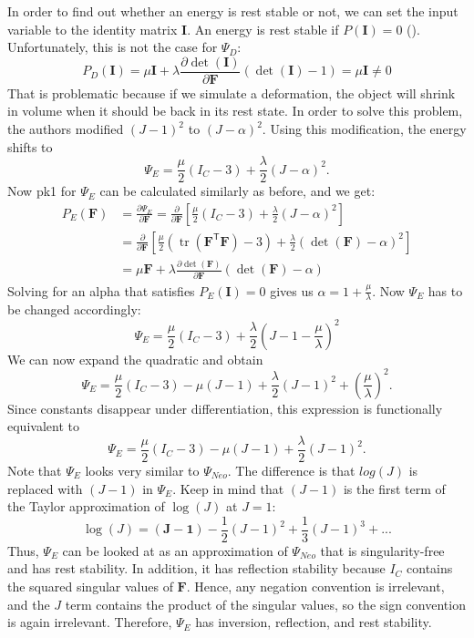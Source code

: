 {{{\[\]
In order to find out whether an energy is rest stable or not, we can set the input variable to the identity matrix $\mathbf{I}$. An energy is rest stable if $P(\mathbf{I})=0$ (\cite{Smith:2018:SNF:3191713.3180491}). Unfortunately, this is not the case for $\Psi_{D}$:
\[
P_{D}(\mathbf{I}) = \mu \mathbf{I} + \lambda \frac{\partial \operatorname{det}(\mathbf{I})}{\partial \mathbf{F}}(\operatorname{det}(\mathbf{I})-1) = \mu \mathbf{I} \neq 0
\]
That is problematic because if we simulate a deformation, the object will shrink in volume when it should be back in its rest state. In order to solve this problem, the authors modified $(J-1)^{2}$ to $(J-\alpha)^{2}$. Using this modification, the energy shifts to
\[
\Psi_{E} = \frac{\mu}{2}\left(I_{C}-3\right) +\frac{\lambda}{2}(J-\alpha)^{2}.
\]
Now \acrshort{pk1} for $\Psi_E$ can be calculated similarly as before, and we get:
\begin{align*}
P_{E}(\mathbf{F}) &= \frac{\partial \Psi_{E}}{\partial \mathbf{F}} = \frac{\partial}{\partial \mathbf{F}}  \left[ \frac{\mu}{2}\left(I_{C}-3\right) +\frac{\lambda}{2}(J-\alpha)^{2} \right] \\
&= \frac{\partial}{\partial \mathbf{F}}  \left[ \frac{\mu}{2}\left(\operatorname{tr}(\mathbf{F}^\mathsf{T} \mathbf{F})-3\right) +\frac{\lambda}{2}(\operatorname{det}(\mathbf{F})-\alpha)^{2} \right] \\
&= \mu \mathbf{F} + \lambda \frac{\partial \operatorname{det}(\mathbf{F})}{\partial \mathbf{F}} (\operatorname{det}(\mathbf{F})-\alpha)
\end{align*}
Solving for an alpha that satisfies $P_{E}(\mathbf{I})=0$ gives us $\alpha=1+\frac{\mu}{\lambda}$. Now $\Psi_{E}$ has to be changed accordingly:
\[
\Psi_{E} = \frac{\mu}{2}\left(I_{C}-3\right) +\frac{\lambda}{2}(J-1-\frac{\mu}{\lambda})^{2}
\]
We can now expand the quadratic and obtain
\[
\Psi_{E} = \frac{\mu}{2}\left(I_{C}-3\right) - \mu\left(J-1\right) + \frac{\lambda}{2}(J-1)^{2} + \left(\frac{\mu}{\lambda}\right)^{2}.
\]
Since constants disappear under differentiation, this expression is functionally equivalent to 
\begin{equation}\label{energy_without_barrier}
\Psi_{E} = \frac{\mu}{2}\left(I_{C}-3\right) - \mu\left(J-1\right) + \frac{\lambda}{2}(J-1)^{2}.
\end{equation}
Note that $\Psi_{E}$ looks very similar to $\Psi_{Neo}$. The difference is that $log(J)$ is replaced with $(J-1)$ in $\Psi_{E}$. Keep in mind that $(J-1)$ is the first term of the Taylor approximation of $\operatorname{log}(J)$ at $J=1$:
\[
\operatorname{log}(J) = \boldsymbol{(J-1)} - \frac{1}{2} (J-1)^{2} + \frac{1}{3} (J-1)^{3} + \text{...}
\]
Thus, $\Psi_{E}$ can be looked at as an approximation of $\Psi_{Neo}$ that is singularity-free and has rest stability. In addition, it has reflection stability because $I_{C}$ contains the squared singular values of $\mathbf{F}$. Hence, any negation convention is irrelevant, and the $J$ term contains the product of the singular values, so the sign convention is again irrelevant. Therefore, $\Psi_{E}$ has inversion, reflection, and rest stability.

}}}
